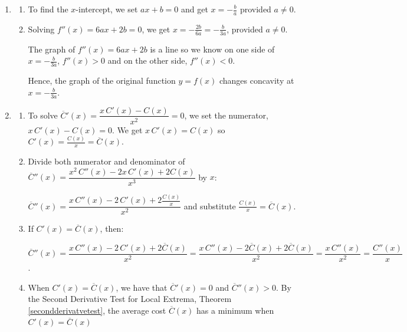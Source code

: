 \documentclass{ximera}
\begin{document}
\begin{enumerate}
\setcounter{enumi}{\value{HW}}

\item  \begin{enumerate}  \item To find the $x$-intercept, we set $ax+b = 0$  and get $x = -\frac{b}{a}$ provided $a \neq 0$.

\item  Solving  $f''(x) = 6ax + 2b = 0$, we get $x = -\frac{2b}{6a} = - \frac{b}{3a}$, provided $a \neq 0$.  

\smallskip

The graph of $f''(x) =  6ax + 2b$ is a line so we know on one side of $x= - \frac{b}{3a}$, $f''(x) > 0$ and on the other side, $f''(x) < 0$.  

\smallskip

Hence, the graph of the original function $y = f(x)$ changes concavity at $x = -\frac{b}{3a}$.

\end{enumerate}

\item\begin{enumerate}  \item  To solve $\overline{C}'(x) = \dfrac{x \, C'(x) - C(x)}{x^2} = 0$, we set the numerator,  $x \, C'(x) - C(x) = 0$. We get  $x \, C'(x)  = C(x)$ so $C'(x) = \frac{C(x)}{x} = \overline{C}(x)$.

\smallskip

\item  Divide both numerator and denominator of  $\overline{C}''(x) = \dfrac{x^2 \, C''(x) - 2x\, C'(x) + 2C(x)}{x^3}$ by $x$: 

\smallskip

$\overline{C}''(x) = \dfrac{x \, C''(x) - 2 \, C'(x) + 2\frac{C(x)}{x}}{x^2}$ and substitute  $\frac{C(x)}{x} = \overline{C}(x)$.

\smallskip

\item  If  $C'(x) = \overline{C}(x)$, then:

\smallskip

 $\overline{C}''(x)  = \dfrac{x\, C''(x) - 2\, C'(x) + 2\overline{C}(x)}{x^2} =  \dfrac{x\, C''(x) - 2\overline{C} (x) + 2\overline{C}(x)}{x^2}= \dfrac{x\, C''(x)}{x^2} =  \dfrac{C''(x)}{x}$.

\smallskip

\item  When $C'(x) = \overline{C}(x)$, we have that $\overline{C}'(x) = 0$ and $\overline{C}''(x) > 0$.  By the Second Derivative Test for Local Extrema,  Theorem \ref{secondderivatvetest}, the average cost $\overline{C}(x)$ has a minimum when $C'(x) = \overline{C}(x)$ 


\end{enumerate}
\end{enumerate}
\end{document}

